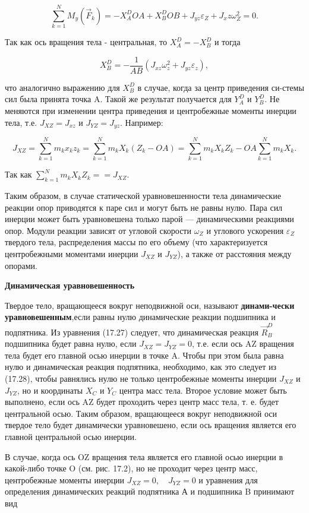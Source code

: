 {\begin{center}
	  $$ \sum\limits_{k=1}^N M_y (\vec F_k) = - X_A^D OA + X_B^D OB + J_{yz} \varepsilon_Z + J_xz \omega_Z^2 = 0.$$
	  
	 \par Так как ось вращения тела - центральная, то $X_A^D = -X_B^D$ и тогда

	 $$X_B^D = -\frac{1}{AB} (J_{xz} \omega_z^2 +J_{yz} \varepsilon_z),$$
	 
	 \par что аналогично выражению для $X_B^D$ в случае, когда за центр приведения си-стемы сил была принята точка A. Такой же результат получается для $Y_A^D$ и $Y_B^D$. Не меняются при изменении центра приведения и центробежные моменты инерции тела, т.е. $J_{XZ} = J_{xz}$ и $J_{YZ} = J_{yz}$. Например:

	 $$ J_{XZ} = \sum\limits_{k=1}^N m_k x_k z_k = \sum\limits_{k=1}^N m_k X_k (Z_k - OA) = \sum\limits_{k=1}^N m_k X_k Z_k - OA\sum\limits_{k=1}^N m_k X_k.$$

	 \par Так как $\sum\limits_{k=1}^N m_k X_k Z_k == J_{XZ}.$

	 \par Таким образом, в случае статической уравновешенности тела динамические реакции опор приводятся к паре сил и могут быть не равны нулю. Пара сил инерции может быть уравновешена только парой — динамическими реакциями опор. Модули реакции зависят от угловой скорости $\omega_Z$ и углового ускорения $\varepsilon_Z$ твердого тела, распределения массы по его объему (что характеризуется центробежными моментами инерции $J_{XZ}$ и $J_{YZ}$), а также от расстояния между опорами.

	 \par\textbf{Динамическая уравновешенность}

	 \par Твердое тело, вращающееся вокруг неподвижной оси, называют \textbf{динами-чески уравновешенным},если равны нулю динамические реакции подшипника и подпятника. Из уравнения (17.27) следует, что динамическая реакция $\vec R_B^D$ подшипника будет равна нулю, если $J_{XZ} = J_{YZ} = 0$, т.е. если ось AZ вращения тела будет его главной осью инерции в точке A. Чтобы при этом была равна нулю и динамическая реакция подпятника, необходимо, как это следует из (17.28),  чтобы равнялись нулю  не  только  центробежные  моменты  инерции $J_{XZ}$ и $J_{YZ}$, но и координаты $X_C$ и $Y_C$ центра масс тела. Второе условие может быть выполнено, если ось AZ будет проходить через центр масс тела, т. е. будет центральной  осью. Таким  образом,  вращающееся  вокруг  неподвижной оси твердое тело будет динамически уравновешено, если ось вращения является его главной центральной осью инерции.
	 \par В случае, когда ось OZ вращения тела является его главной осью инерции в какой-либо точке O (см. рис. 17.2), но не проходит через центр масс, центробежные моменты инерции $J_{XZ} = 0, \quad J_{YZ} = 0$ и уравнения для определения динамических реакций подпятника А и подшипника B принимают вид


\end{center}}
